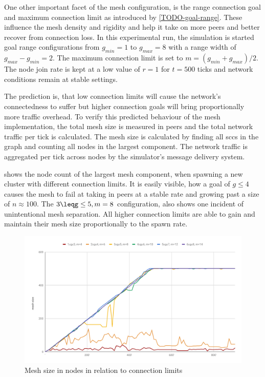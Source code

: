 One other important facet of the mesh configuration, is the range connection goal and maximum connection limit as introduced by \vref{TODO-goal-range}. These influence the mesh density and rigidity and help it take on more peers and better recover from connection loss. In this experimental run, the simulation is started goal range configurations from $g_{min}=1$ to $g_{max}=8$ with a range width of $g_{max}-g_{min}=2$. The maximum connection limit is set to $m=(g_{min}+g_{max})/2$. The node join rate is kept at a low value of $r=1$ for $t=500$ ticks and network conditions remain at stable settings.

The prediction is, that low connection limits will cause the network's connectedness to suffer but higher connection goals will bring proportionally more traffic overhead.
To verify this predicted behaviour of the mesh implementation, the total mesh size is measured in peers and the total network traffic per tick is calculated.
The mesh size is calculated by finding all \glspl{scc} in the graph and counting all nodes in the largest component. The network traffic is aggregated per tick across nodes by the simulator's message delivery system.

 shows the node count of the largest mesh component, when spawning a new cluster with different connection limits. It is easily visible, how a goal of $g\leq4$ causes the mesh to fail at taking in peers at a stable rate and growing past a size of $n\approx100$. The $3\leqg\leq5, m=8$ configuration, also shows one incident of unintentional mesh separation. All higher connection limits are able to gain and maintain their mesh size proportionally to the spawn rate.

\begin{figure}[htb!]
\centering
\includegraphics[width=1.0\textwidth]{graphics/analysis/connection-limit-largest-component.pdf}
\caption{Mesh size in nodes in relation to connection limits}
\label{fig:connection-limits-largest-component}
\end{figure}

